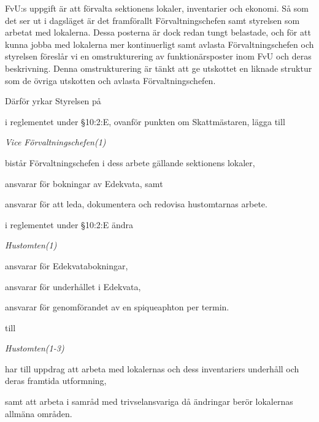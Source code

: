 \documentclass[../_main/handlingar.tex]{subfiles}
\begin{document}

FvU:s uppgift är att förvalta sektionens lokaler, inventarier och ekonomi. Så som det ser ut i dagsläget är det framförallt Förvaltningschefen samt styrelsen som arbetat med lokalerna. Dessa posterna är dock redan tungt belastade, och för att kunna jobba med lokalerna mer kontinuerligt samt avlasta Förvaltningschefen och styrelsen föreslår vi en omstrukturering av funktionärsposter inom FvU och deras beskrivning.  Denna omstrukturering är tänkt att ge utskottet en liknade struktur som de övriga utskotten och avlasta Förvaltningschefen.

Därför yrkar Styrelsen på
\begin{attsatser}
    \att i reglementet under \S10:2:E, ovanför punkten om Skattmästaren, lägga till\par
    {\it
    Vice Förvaltningschefen(1)
    \begin{tightdashlist}
      \item bistår Förvaltningschefen i dess arbete gällande sektionens lokaler,
      \item ansvarar för bokningar av Edekvata, samt
      \item ansvarar för att leda, dokumentera och redovisa hustomtarnas arbete.
    \end{tightdashlist}
    }

    \att i reglementet under \S10:2:E ändra\par
    {\it
    Hustomten(1)
    \begin{tightdashlist}
      \item ansvarar för Edekvatabokningar,
      \item ansvarar för underhållet i Edekvata,
      \item ansvarar för genomförandet av en spiqueaphton per termin.
    \end{tightdashlist}
    }
    till\par
    {\it
    Hustomten(1-3)
    \begin{tightdashlist}
      \item har till uppdrag att arbeta med lokalernas och dess inventariers underhåll och deras framtida utformning,
      \item samt att arbeta i samråd med trivselansvariga då ändringar berör lokalernas allmäna områden.
    \end{tightdashlist}
    }


\end{attsatser}
\end{document}
